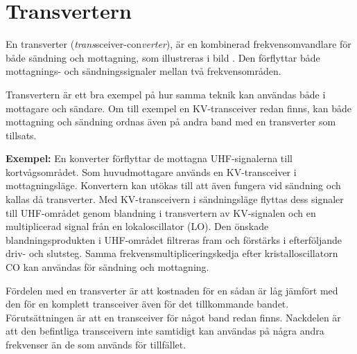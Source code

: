 \section{Transvertern}


En transverter (\emph{trans}sceiver-con\emph{verter}), är en kombinerad
frekvensomvandlare för både sändning och mottagning, som illustreras i
bild .
Den förflyttar både mottagnings- och sändningssignaler mellan två
frekvensområden.

Transvertern är ett bra exempel på hur samma teknik kan användas både
i mottagare och sändare.
Om till exempel en KV-transceiver redan finns, kan både mottagning och sändning
ordnas även på andra band med en transverter som tillsats.

\textbf{Exempel:}
En konverter förflyttar de mottagna UHF-signalerna till kortvågsområdet.
Som huvudmottagare används en KV-transceiver i mottagningsläge.
Konvertern kan utökas till att även fungera vid sändning och kallas då
transverter.
Med KV-transceivern i sändningsläge flyttas dess signaler till UHF-området
genom blandning i transvertern av KV-signalen och en multiplicerad signal
från en lokaloscillator (LO).
Den önskade blandningsprodukten i UHF-området filtreras fram och förstärks i
efterföljande driv- och slutsteg.
Samma frekvensmultipliceringskedja efter kristalloscillatorn CO kan användas
för sändning och mottagning.

Fördelen med en transverter är att kostnaden för en sådan är låg jämfört med
den för en komplett transceiver även för det tillkommande bandet.
Förutsättningen är att en transceiver för något band redan finns.
Nackdelen är att den befintliga transceivern inte samtidigt kan användas på
några andra frekvenser än de som används för tillfället.
